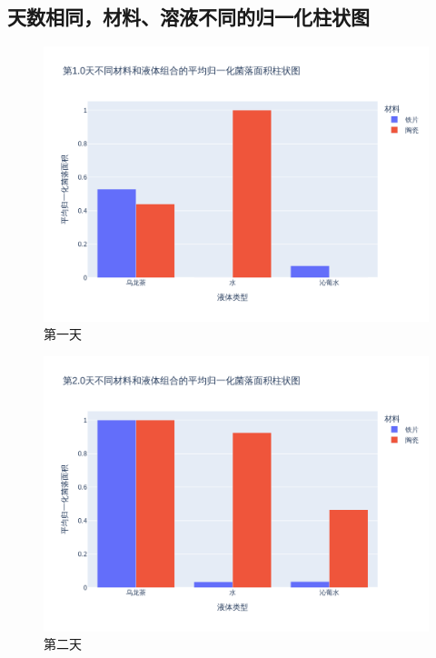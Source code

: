 \documentclass[12pt,a4paper]{ctexart}
\begin{document}
\subsection{天数相同，材料、溶液不同的归一化柱状图}
\begin{figure}[H]  %
    \centering  %
    \includegraphics[width=\textwidth]{./plot/SingleDay/bar_normalized_day1.0.png}  %
    \caption{第一天}  %
    \label{fig:SingleDayBar1}  %
\end{figure}
\begin{figure}[H]  %
    \centering  %
    \includegraphics[width=\textwidth]{./plot/SingleDay/bar_normalized_day2.0.png}  %
    \caption{第二天}  %
    \label{fig:SingleDayBar2}  %
\end{figure}
\end{document}
